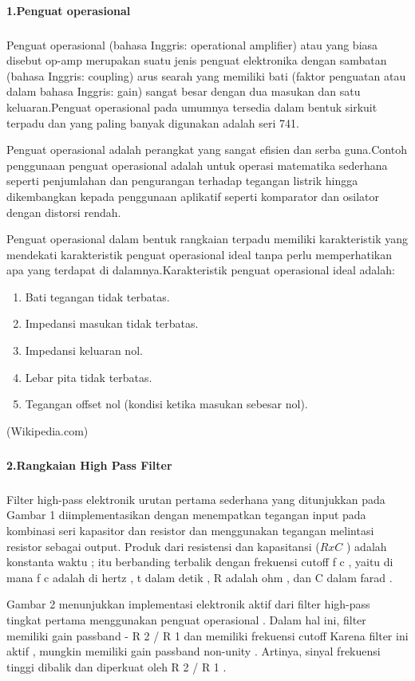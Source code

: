 \documentclass[12pt,a4paper]{article}
\begin{document}
\paragraph{ }
\textbf{1.Penguat operasional}
\subparagraph{ }
 Penguat operasional (bahasa Inggris: operational amplifier) atau yang biasa disebut op-amp merupakan suatu jenis penguat elektronika dengan sambatan (bahasa Inggris: coupling) arus searah yang memiliki bati (faktor penguatan atau dalam bahasa Inggris: gain) sangat besar dengan dua masukan dan satu keluaran.Penguat operasional pada umumnya tersedia dalam bentuk sirkuit terpadu dan yang paling banyak digunakan adalah seri 741.

Penguat operasional adalah perangkat yang sangat efisien dan serba guna.Contoh penggunaan penguat operasional adalah untuk operasi matematika sederhana seperti penjumlahan dan pengurangan terhadap tegangan listrik hingga dikembangkan kepada penggunaan aplikatif seperti komparator dan osilator dengan distorsi rendah.

Penguat operasional dalam bentuk rangkaian terpadu memiliki karakteristik yang mendekati karakteristik penguat operasional ideal tanpa perlu memperhatikan apa yang terdapat di dalamnya.Karakteristik penguat operasional ideal adalah:
\begin{enumerate}
\item Bati tegangan tidak terbatas.
\item Impedansi masukan tidak terbatas.
\item Impedansi keluaran nol.
\item Lebar pita tidak terbatas.
\item Tegangan offset nol (kondisi ketika masukan sebesar nol).
\end{enumerate}
	
\begin{flushright}
(Wikipedia.com)
\end{flushright}

\subparagraph{ }
\textbf{2.Rangkaian High Pass Filter}
\subparagraph{ }
 Filter high-pass elektronik urutan pertama sederhana yang ditunjukkan pada Gambar 1 diimplementasikan dengan menempatkan tegangan input pada kombinasi seri kapasitor dan resistor dan menggunakan tegangan melintasi resistor sebagai output. Produk dari resistensi dan kapasitansi ($ R x C $ ) adalah konstanta waktu ; itu berbanding terbalik dengan frekuensi cutoff f c , yaitu di mana f c adalah di hertz , t dalam detik , R adalah ohm , dan C dalam farad .

Gambar 2 menunjukkan implementasi elektronik aktif dari filter high-pass tingkat pertama menggunakan penguat operasional . Dalam hal ini, filter memiliki gain passband - R 2 / R 1 dan memiliki frekuensi cutoff Karena filter ini aktif , mungkin memiliki gain passband non-unity . Artinya, sinyal frekuensi tinggi dibalik dan diperkuat oleh R 2 / R 1 .
\end{document}
